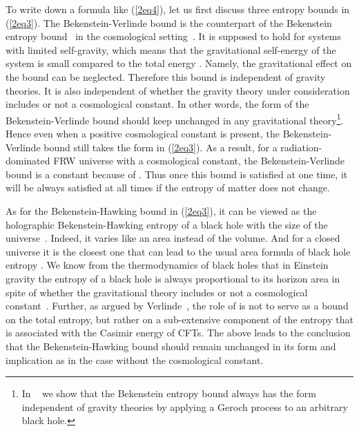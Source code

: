 \documentclass[a4paper,12pt]{article}
\begin{document}
To write down a formula like (\ref{2eq4}), let us first
discuss three entropy bounds in (\ref{2eq3}). The
Bekenstein-Verlinde bound \coordHE{} is the counterpart of the
Bekenstein entropy bound~\cite{Beke} in the cosmological
setting~\cite{CMO}. It is supposed to hold for systems with
limited self-gravity, which means that the gravitational
self-energy of the system is small compared to the total energy
\coordHE{}. Namely, the gravitational effect on the bound can be
neglected. Therefore this bound is independent of gravity
theories. It is also independent of
whether the gravity theory under consideration includes or not a 
cosmological constant. In other words, the form of the Bekenstein-Verlinde
bound should keep unchanged in any gravitational theory\footnote{
In ~\cite{CM} we show that the Bekenstein entropy bound always
has the form \coordHE{} independent of gravity
theories by applying a Geroch process to an arbitrary black hole.}. 
Hence even when a positive cosmological constant is present, the
Bekenstein-Verlinde bound still takes the form in
(\ref{2eq3}). As a result, for a radiation-dominated FRW universe with a
cosmological constant, the Bekenstein-Verlinde bound is a constant 
because of \coordHE{}. Thus once this bound is satisfied at one time,
 it will be always satisfied at all times if the entropy
 \coordHE{} of matter does not change.

 As for the Bekenstein-Hawking bound in (\ref{2eq3}), it can be
 viewed as the holographic Bekenstein-Hawking entropy of a black
 hole with the size of the universe~\cite{Verl}. Indeed, it varies
 like an area instead of the volume. And for a closed universe it
 is the closest one that can lead to the usual area formula of black
 hole entropy \coordHE{}. We know from the thermodynamics of black
 holes that in Einstein gravity  the entropy of a black hole
 is always proportional to its horizon area in spite of whether the
 gravitational theory includes or not a cosmological
 constant~\cite{TM}. Further, as argued by Verlinde~\cite{Verl},
 the role of \coordHE{} is not to serve as a bound on the total
 entropy, but rather on a sub-extensive component of the entropy
 that is associated with the Casimir energy of CFTs. The above
 leads to the conclusion that the Bekenstein-Hawking bound should
 remain unchanged in its form and implication as in the case without
 the cosmological constant.
\end{document}
